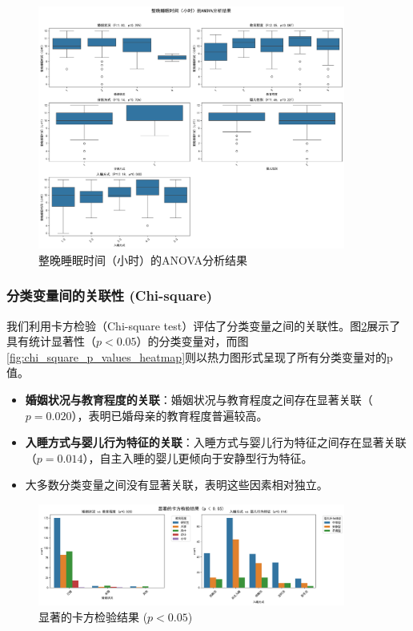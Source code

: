 \documentclass[withoutpreface,bwprint]{cumcmthesis}
\begin{document}
\begin{figure}[htbp]
    \centering
    \includegraphics[width=0.9\textwidth]{figures/anova_整晚睡眠时间（小时）_combined.png}
    \caption{整晚睡眠时间（小时）的ANOVA分析结果}
    \label{fig:anova_sleep_time}
\end{figure}

\subsubsection{分类变量间的关联性 (Chi-square)}
我们利用卡方检验（Chi-square test）评估了分类变量之间的关联性。图\ref{fig:chi_square_significant}展示了具有统计显著性（$p<0.05$）的分类变量对，而图\ref{fig:chi_square_p_values_heatmap}则以热力图形式呈现了所有分类变量对的p值。
\begin{itemize}
    \item \textbf{婚姻状况与教育程度的关联}：婚姻状况与教育程度之间存在显著关联（$p=0.020$），表明已婚母亲的教育程度普遍较高。
    \item \textbf{入睡方式与婴儿行为特征的关联}：入睡方式与婴儿行为特征之间存在显著关联（$p=0.014$），自主入睡的婴儿更倾向于安静型行为特征。
    \item 大多数分类变量之间没有显著关联，表明这些因素相对独立。
\end{itemize}

\begin{figure}[htbp]
    \centering
    \includegraphics[width=0.9\textwidth]{figures/chi_square_significant_results.png}
    \caption{显著的卡方检验结果 ($p < 0.05$)}
    \label{fig:chi_square_significant}
\end{figure}
\end{document}

